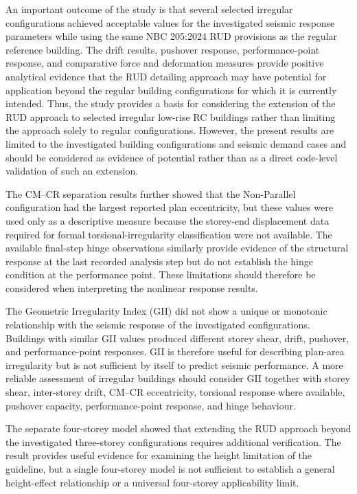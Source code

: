 An important outcome of the study is that several selected irregular configurations achieved acceptable values for the investigated seismic response parameters while using the same NBC 205:2024 RUD provisions as the regular reference building. The drift results, pushover response, performance-point response, and comparative force and deformation measures provide positive analytical evidence that the RUD detailing approach may have potential for application beyond the regular building configurations for which it is currently intended. Thus, the study provides a basis for considering the extension of the RUD approach to selected irregular low-rise RC buildings rather than limiting the approach solely to regular configurations. However, the present results are limited to the investigated building configurations and seismic demand cases and should be considered as evidence of potential rather than as a direct code-level validation of such an extension.

The CM--CR separation results further showed that the Non-Parallel configuration had the largest reported plan eccentricity, but these values were used only as a descriptive measure because the storey-end displacement data required for formal torsional-irregularity classification were not available. The available final-step hinge observations similarly provide evidence of the structural response at the last recorded analysis step but do not establish the hinge condition at the performance point. These limitations should therefore be considered when interpreting the nonlinear response results.

The Geometric Irregularity Index (GII) did not show a unique or monotonic relationship with the seismic response of the investigated configurations. Buildings with similar GII values produced different storey shear, drift, pushover, and performance-point responses. GII is therefore useful for describing plan-area irregularity but is not sufficient by itself to predict seismic performance. A more reliable assessment of irregular buildings should consider GII together with storey shear, inter-storey drift, CM--CR eccentricity, torsional response where available, pushover capacity, performance-point response, and hinge behaviour.

The separate four-storey model showed that extending the RUD approach beyond the investigated three-storey configurations requires additional verification. The result provides useful evidence for examining the height limitation of the guideline, but a single four-storey model is not sufficient to establish a general height-effect relationship or a universal four-storey applicability limit.

